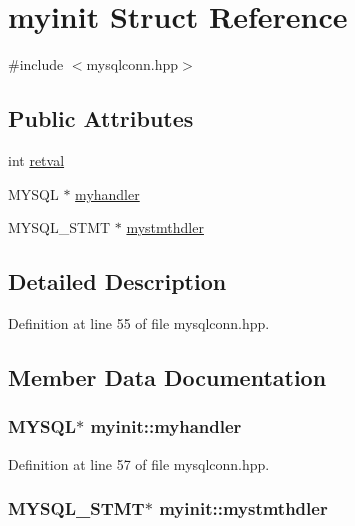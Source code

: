 \hypertarget{structmyinit}{\section{myinit Struct Reference}
\label{structmyinit}
}


{\ttfamily \#include $<$mysqlconn.\-hpp$>$}

\subsection*{Public Attributes}
\begin{DoxyCompactItemize}
\item 
int \hyperlink{structmyinit_ab7400d7727260819f731e0becd418539}{retval}
\item 
M\-Y\-S\-Q\-L $\ast$ \hyperlink{structmyinit_ae120094fd4986071616ef4c275d0b3b9}{myhandler}
\item 
M\-Y\-S\-Q\-L\-\_\-\-S\-T\-M\-T $\ast$ \hyperlink{structmyinit_ae6df2ab830cfad68d99e053483f2a3c3}{mystmthdler}
\end{DoxyCompactItemize}


\subsection{Detailed Description}


Definition at line 55 of file mysqlconn.\-hpp.



\subsection{Member Data Documentation}
\hypertarget{structmyinit_ae120094fd4986071616ef4c275d0b3b9}{
\subsubsection[{myhandler}]{\setlength{\rightskip}{0pt plus 5cm}M\-Y\-S\-Q\-L$\ast$ myinit\-::myhandler}}\label{structmyinit_ae120094fd4986071616ef4c275d0b3b9}


Definition at line 57 of file mysqlconn.\-hpp.

\hypertarget{structmyinit_ae6df2ab830cfad68d99e053483f2a3c3}{
\subsubsection[{mystmthdler}]{\setlength{\rightskip}{0pt plus 5cm}M\-Y\-S\-Q\-L\-\_\-\-S\-T\-M\-T$\ast$ myinit\-::mystmthdler}}\label{structmyinit_ae6df2ab830cfad68d99e053483f2a3c3}


